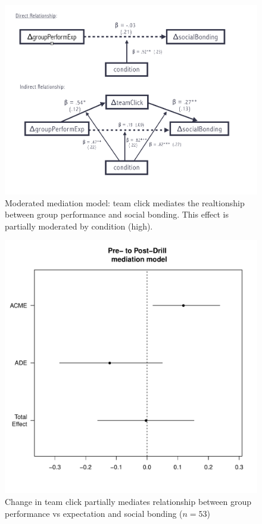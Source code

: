 \begin{figure}
  \centering
  \includegraphics[width=0.9\linewidth,keepaspectratio] {images/modMedChangePrePost}
  \caption{Moderated mediation model: team click mediates the realtionship between group performance and social bonding.  This effect is partially moderated by condition (high).}
  \label{fig:prePostExperimentChangeModMedFigure}
\end{figure}

\begin{figure}
  \centering
  \includegraphics[width=0.5\linewidth,keepaspectratio] {images/groupPerfExpClickChangeMedPlot}
  \caption{Change in team click partially mediates relationship between group performance vs expectation and social bonding ($n = 53$)}
  \label{fig:groupPerfExpClickChangeMedPlot}
\end{figure}

